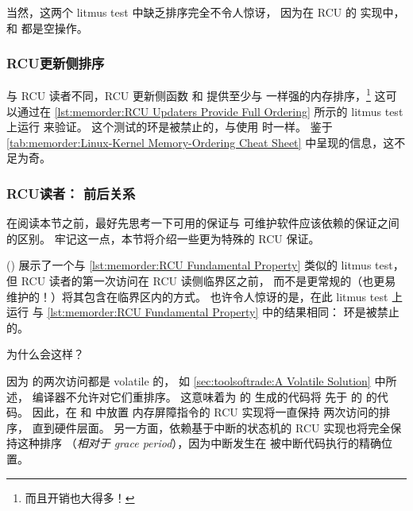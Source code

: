 当然，这两个 litmus test 中缺乏排序完全不令人惊讶，
因为在 RCU 的  实现中， 和
 都是空操作。

\subsubsection{RCU更新侧排序}
\label{sec:memorder:RCU Update-Side Ordering}

与 RCU 读者不同，RCU 更新侧函数
 和 
提供至少与  一样强的内存排序，\footnote{
	而且开销也大得多！}
这可以通过在
\cref{lst:memorder:RCU Updaters Provide Full Ordering}
所示的 litmus test 上运行  来验证。
这个测试的环是被禁止的，与使用  时一样。
鉴于 \cref{tab:memorder:Linux-Kernel Memory-Ordering Cheat Sheet}
中呈现的信息，这不足为奇。

\begin{listing}

\caption{RCU更新者提供完全排序}
\label{lst:memorder:RCU Updaters Provide Full Ordering}
\end{listing}

\subsubsection{RCU读者：
			    前后关系}
\label{sec:memorder:RCU Readers: Before and After}

在阅读本节之前，最好先思考一下可用的保证与
可维护软件应该依赖的保证之间的区别。
牢记这一点，本节将介绍一些更为特殊的 RCU 保证。

\begin{listing}

\caption{RCU读者之前发生了什么？}
\label{lst:memorder:What Happens Before RCU Readers?}
\end{listing}

()
展示了一个与 \cref{lst:memorder:RCU Fundamental Property} 类似的 litmus test，
但 RCU 读者的第一次访问在 RCU 读侧临界区之前，
而不是更常规的（也更易维护的！）将其包含在临界区内的方式。
也许令人惊讶的是，在此 litmus test 上运行  与
\cref{lst:memorder:RCU Fundamental Property} 中的结果相同：
环是被禁止的。

为什么会这样？

因为  的两次访问都是 volatile 的，
如 \cref{sec:toolsoftrade:A Volatile Solution} 中所述，
编译器不允许对它们重排序。
这意味着为  的  生成的代码将
先于  的  的代码。
因此，在  和  中放置
内存屏障指令的 RCU 实现将一直保持  两次访问的排序，
直到硬件层面。
另一方面，依赖基于中断的状态机的 RCU 实现也将完全保持这种排序
（\emph{相对于 grace period}），因为中断发生在
被中断代码执行的精确位置。

